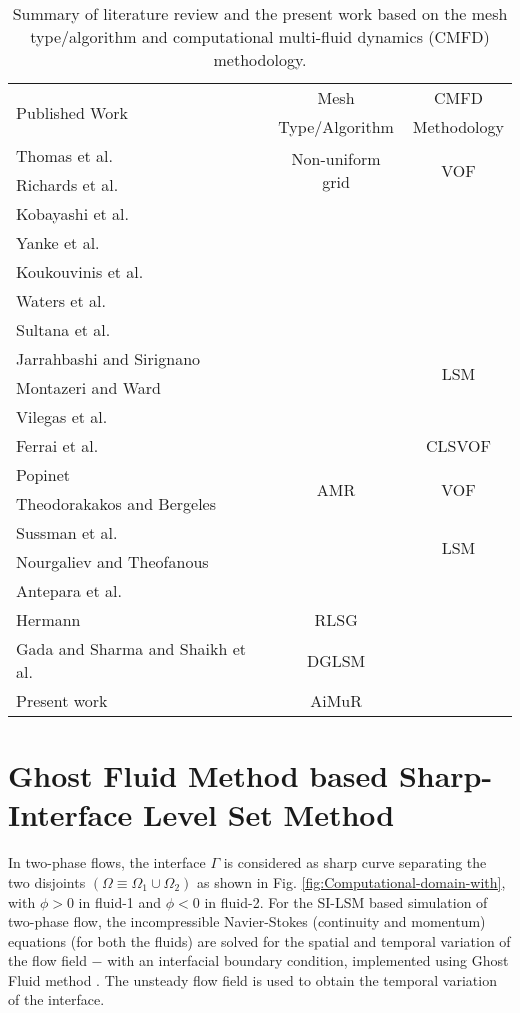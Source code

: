 \documentclass[preprint,12pt]{elsarticle}
\newcommand{\review}[1]{\color{black}#1}
\begin{document}
\begin{table}
\protect\caption{\label{tab:Summary-of-literature}Summary of literature review and the present work based
on the \review{mesh type/algorithm} and computational multi-fluid dynamics (CMFD) methodology. }


\centering{}%
\begin{tabular}{|l|c|c|}
\hline
\multirow{2}{*}{Published Work} & \review{Mesh} & CMFD \tabularnewline
 & \review{Type/Algorithm} & Methodology\tabularnewline
\hline
Thomas et al. \cite{thomas2010} & \multirow{2}{*}{Non-uniform grid} & \multirow{2}{*}{VOF}\tabularnewline
\cline{1-1}
Richards et al. \cite{richards1995} &  & \tabularnewline
\cline{1-1}
Kobayashi et al. \cite{kobayashi2004} &  & \tabularnewline
\cline{1-1}
Yanke et al. \cite{Yanke2015} &  & \tabularnewline
\cline{1-1}
Koukouvinis et al. \cite{koukouvinis2016} &  & \tabularnewline
\cline{1-1}
Waters et al. \cite{waters2017} &  & \tabularnewline
\cline{1-1}
Sultana et al. \cite{sultana2017} &  & \tabularnewline
\cline{1-1} \cline{3-3}
Jarrahbashi and Sirignano \cite{Jarrahbashi2014} &  & \multirow{2}{*}{LSM}\tabularnewline
\cline{1-1}
Montazeri and Ward \cite{Montezari2014} &  & \tabularnewline
\cline{1-1}
Vilegas et al. \cite{villegas2016,villegas2017} &  & \tabularnewline
\cline{1-1} \cline{3-3}
Ferrai et al. \cite{ferrari2017} &  & CLSVOF\tabularnewline
\hline
Popinet \cite{popinet2009}  & \multirow{2}{*}{AMR} & \multirow{2}{*}{VOF}\tabularnewline
\cline{1-1}
Theodorakakos and Bergeles \cite{theodorakakos2004} &  & \tabularnewline
\cline{1-1}
\cline{3-3}
Sussman et al. \cite{sussman1999} &  & \multirow{2}{*}{LSM}\tabularnewline
\cline{1-1}
Nourgaliev and Theofanous \cite{nourgaliev2007} &  & \tabularnewline
\cline{1-1}
Antepara et al. \cite{antepara2019} &  & \tabularnewline
\cline{1-2}
Hermann \cite{hermann2008} & RLSG & \tabularnewline
\cline{1-2}
Gada and Sharma \cite{gada2011} and Shaikh et al. \cite{shaikh2019} & DGLSM & \tabularnewline
\cline{1-2}
Present work & AiMuR & \tabularnewline
\hline
\end{tabular}
\end{table}


\section{Ghost Fluid Method based Sharp-Interface Level Set Method}\label{sec3}
In two-phase flows, the interface $\Gamma$ is considered as sharp
curve separating the two disjoints $\left(\Omega\equiv\Omega_{1}\cup\Omega_{2}\right)$
as shown in Fig. \textcolor{black}{\ref{fig:Computational-domain-with}}, with $\phi>0$ in fluid-1 and $\phi<0$ in fluid-2.
For the SI-LSM based simulation of two-phase flow, the incompressible
Navier-Stokes (continuity and momentum) equations (for both the fluids)
are solved for the spatial and temporal variation of the flow field
$-$ with an interfacial boundary condition, implemented using Ghost
Fluid method \cite{fedkiw1999}. The unsteady flow field is used to obtain
the temporal variation of the interface.
\end{document}
